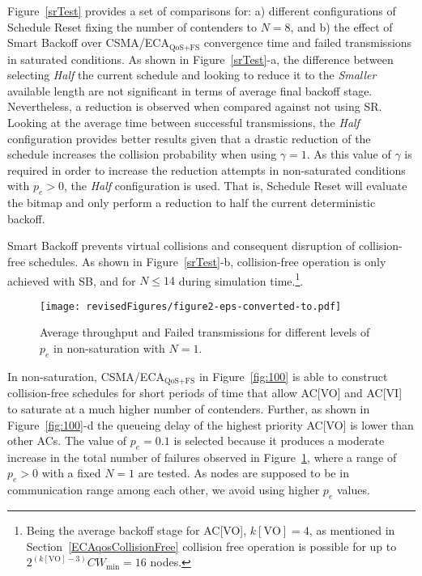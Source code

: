 \documentclass[a4paper]{article}
\begin{document}
Figure~\ref{srTest} provides a set of comparisons for: a) different configurations of Schedule Reset fixing the number of contenders to $N=8$, and b) the effect of Smart Backoff over CSMA/ECA$_\text{QoS+FS}$ convergence time and failed transmissions in saturated conditions. As shown in Figure~\ref{srTest}-a, the difference between selecting \emph{Half} the current schedule and looking to reduce it to the \emph{Smaller} available length are not significant in terms of average final backoff stage. Nevertheless, a reduction is observed when compared against not using SR. Looking at the average time between successful transmissions, the \emph{Half} configuration provides better results given that a drastic reduction of the schedule increases the collision probability when using $\gamma=1$. As this value of $\gamma$ is required in order to increase the reduction attempts in non-saturated conditions with $p_e>0$, the \emph{Half} configuration is used. That is, Schedule Reset will evaluate the bitmap and only perform a reduction to half the current deterministic backoff.

Smart Backoff prevents virtual collisions and consequent disruption of collision-free schedules. As shown in Figure~\ref{srTest}-b, collision-free operation is only achieved with SB, and for $N\le14$ during simulation time.\footnote{Being the average backoff stage for AC[VO], $k[\text{VO}]=4$, as mentioned in Section~\ref{ECAqosCollisionFree} collision free operation is possible for up to $2^{(k[\text{VO}]-3)}CW_{\min} = 16$ nodes.}.

	\begin{figure}[t]
	\centering
		\texttt{[image: revisedFigures/figure2-eps-converted-to.pdf]}
		\caption{Average throughput and Failed transmissions for different levels of $p_{e}$ in non-saturation with $N=1$.}
		\label{fig:evError}
	\end{figure}

In non-saturation, CSMA/ECA$_{\text{QoS+FS}}$ in Figure~\ref{fig:100} is able to construct collision-free schedules for short periods of time that allow AC[VO] and AC[VI] to saturate at a much higher number of contenders. Further, as shown in Figure~\ref{fig:100}-d the queueing delay of the highest priority AC[VO] is lower than other ACs. The value of $p_e=0.1$ is selected because it produces a moderate increase in the total number of failures observed in Figure~\ref{fig:evError}, where a range of $p_e>0$ with a fixed $N=1$ are tested. As nodes are supposed to be in communication range among each other, we avoid using higher $p_e$ values.
\end{document}
